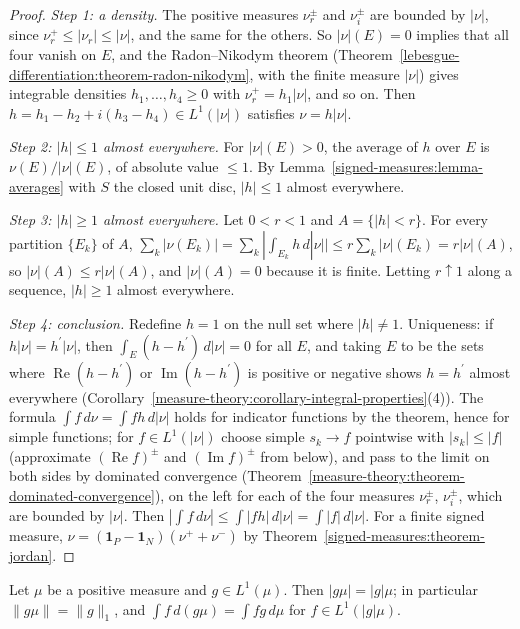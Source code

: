 \begin{proof}
\emph{Step 1: a density.} The positive measures $\nu_r^\pm$ and $\nu_i^\pm$ are bounded by $|\nu|$, since $\nu_r^+ \leq |\nu_r| \leq |\nu|$, and the same for the others. So $|\nu|(E) = 0$ implies that all four vanish on $E$, and the Radon--Nikodym theorem
(Theorem~\ref{lebesgue-differentiation:theorem-radon-nikodym}, with the finite measure $|\nu|$) gives integrable densities $h_1, \ldots, h_4 \geq 0$ with $\nu_r^+ = h_1|\nu|$, and so on. Then
$h = h_1 - h_2 + i(h_3 - h_4) \in L^1(|\nu|)$ satisfies $\nu = h|\nu|$.

\emph{Step 2: $|h| \leq 1$ almost everywhere.} For $|\nu|(E) > 0$, the average of $h$ over $E$ is $\nu(E)/|\nu|(E)$, of absolute value $\leq 1$. By Lemma~\ref{signed-measures:lemma-averages} with
$S$ the closed unit disc, $|h| \leq 1$ almost everywhere.

\emph{Step 3: $|h| \geq 1$ almost everywhere.} Let $0 < r < 1$ and $A = \{|h| < r\}$. For every partition $\{E_k\}$ of $A$,
$\sum_k|\nu(E_k)| = \sum_k|\int_{E_k}h\,d|\nu|| \leq r\sum_k|\nu|(E_k) = r|\nu|(A)$, so $|\nu|(A) \leq r|\nu|(A)$, and $|\nu|(A) = 0$ because it is finite. Letting $r \uparrow 1$ along a sequence,
$|h| \geq 1$ almost everywhere.

\emph{Step 4: conclusion.} Redefine $h = 1$ on the null set where $|h| \neq 1$. Uniqueness: if $h|\nu| = h^{\prime}|\nu|$, then $\int_E(h - h^{\prime})\,d|\nu| = 0$ for all $E$, and taking $E$ to be the sets
where $\operatorname{Re}(h - h^{\prime})$ or $\operatorname{Im}(h - h^{\prime})$ is positive or negative shows $h = h^{\prime}$ almost everywhere (Corollary~\ref{measure-theory:corollary-integral-properties}(4)).
The formula $\int f\,d\nu = \int fh\,d|\nu|$ holds for indicator functions by the theorem, hence for simple functions; for $f \in L^1(|\nu|)$ choose simple $s_k \to f$ pointwise with $|s_k| \leq |f|$
(approximate $(\operatorname{Re}f)^\pm$ and $(\operatorname{Im}f)^\pm$ from below), and pass to the limit on both sides by dominated convergence (Theorem~\ref{measure-theory:theorem-dominated-convergence}),
on the left for each of the four measures $\nu_r^\pm$, $\nu_i^\pm$, which are bounded by $|\nu|$. Then $|\int f\,d\nu| \leq \int|fh|\,d|\nu| = \int|f|\,d|\nu|$. For a finite signed measure,
$\nu = (\mathbf{1}_P - \mathbf{1}_N)(\nu^+ + \nu^-)$ by Theorem~\ref{signed-measures:theorem-jordan}.
\end{proof}

\begin{proposition}\label{signed-measures:proposition-variation-density}
Let $\mu$ be a positive measure and $g \in L^1(\mu)$. Then $|g\mu| = |g|\mu$; in particular $\|g\mu\| = \|g\|_1$, and $\int f\,d(g\mu) = \int fg\,d\mu$ for $f \in L^1(|g|\mu)$.
\end{proposition}

